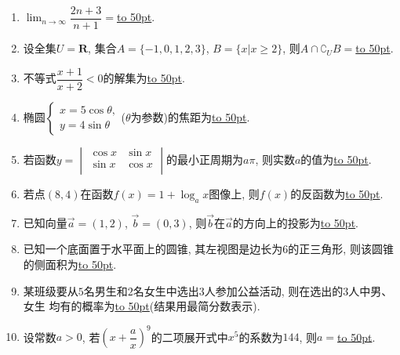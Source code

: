 \documentclass[10pt,a4paper]{article}
\newcommand{\blank}[1]{\underline{\hbox to #1pt{}}}
\begin{document}
\begin{enumerate}[1.]
\item $\displaystyle\lim_{n\to\infty}\dfrac{2n+3}{n+1}=$\blank{50}.
\item 设全集$U=\mathbf{R}$, 集合$A=\{-1,0,1,2,3\}$, $B=\{x|x\ge 2\}$, 则$A\cap {\complement_U}B=$\blank{50}.
\item 不等式$\dfrac{x+1}{x+2}<0$的解集为\blank{50}.
\item 椭圆$\begin{cases} x=5\cos \theta,  \\ y=4\sin \theta  \end{cases}$($\theta$为参数)的焦距为\blank{50}.
\item 若函数$y=\begin{vmatrix}   \cos x & \sin x  \\   \sin x & \cos x  \\ \end{vmatrix}$的最小正周期为$a\pi $, 则实数$a$的值为\blank{50}.
\item 若点$(8,4)$在函数$f(x)=1+\log_a x$图像上, 则$f(x)$的反函数为\blank{50}.
\item 已知向量$\overrightarrow{a}=(1,2)$, $\overrightarrow{b}=(0,3)$, 则$\overrightarrow{b}$在$\overrightarrow{a}$的方向上的投影为\blank{50}.
\item 已知一个底面置于水平面上的圆锥, 其左视图是边长为6的正三角形, 则该圆锥的侧面积为\blank{50}.
\item 某班级要从$5$名男生和$2$名女生中选出$3$人参加公益活动, 则在选出的$3$人中男、女生
均有的概率为\blank{50}(结果用最简分数表示).
\item 设常数$a>0$, 若$(x+\dfrac ax)^9$的二项展开式中$x^5$的系数为$144$, 则$a=$\blank{50}.



\end{enumerate}
\end{document}
